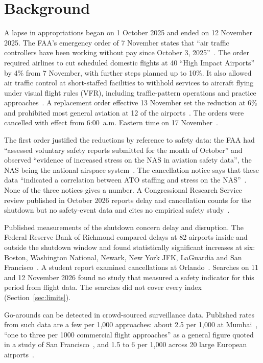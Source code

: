 \documentclass[11pt]{article}
\begin{document}
\section{Background}\label{sec:background}

A lapse in appropriations began on 1 October 2025 and ended on 12 November 2025. The FAA's emergency order of 7 November states that ``air traffic controllers have been working without pay since October 3, 2025''~\cite{faa2025order1}. The order required airlines to cut scheduled domestic flights at 40 ``High Impact Airports'' by 4\% from 7 November, with further steps planned up to 10\%. It also allowed air traffic control at short-staffed facilities to withhold services to aircraft flying under visual flight rules (VFR), including traffic-pattern operations and practice approaches~\cite{faa2025order1}. A replacement order effective 13 November set the reduction at 6\% and prohibited most general aviation at 12 of the airports~\cite{faa2025order2}. The orders were cancelled with effect from 6:00~a.m. Eastern time on 17 November~\cite{faa2025cancel}.

The first order justified the reductions by reference to safety data: the FAA had ``assessed voluntary safety reports submitted for the month of October'' and observed ``evidence of increased stress on the NAS in aviation safety data'', the NAS being the national airspace system~\cite{faa2025order1}. The cancellation notice says that these data ``indicated a correlation between ATO staffing and stress on the NAS''~\cite{faa2025cancel}. None of the three notices gives a number. A Congressional Research Service review published in October 2026 reports delay and cancellation counts for the shutdown but no safety-event data and cites no empirical safety study~\cite{crs2026}.

Published measurements of the shutdown concern delay and disruption. The Federal Reserve Bank of Richmond compared delays at 82 airports inside and outside the shutdown window and found statistically significant increases at six: Boston, Washington National, Newark, New York JFK, LaGuardia and San Francisco~\cite{wong2025}. A student report examined cancellations at Orlando~\cite{cruz2025}. Searches on 11 and 12 November 2026 found no study that measured a safety indicator for this period from flight data. The searches did not cover every index (Section~\ref{sec:limits}).

Go-arounds can be detected in crowd-sourced surveillance data. Published rates from such data are a few per 1,000 approaches: about 2.5 per 1,000 at Mumbai~\cite{proud2020}, ``one to three per 1000 commercial flight approaches'' as a general figure quoted in a study of San Francisco~\cite{kumar2021}, and 1.5 to 6 per 1,000 across 20 large European airports~\cite{figuet2023}.
\end{document}
